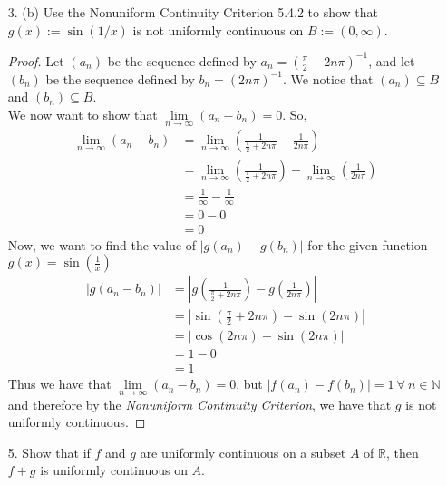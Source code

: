\documentclass[12pt,letterpaper]{article}
\newcommand{\abs}[1]{\left\lvert #1 \right\rvert}
\newcommand{\R}{\mathbb{R}}
\newcommand{\N}{\mathbb{N}}
\theoremstyle{case}
\theoremstyle{definition}
\begin{document}
\begin{enumerate}
\begin{enumerate}
				\item[3. (b)] Use the Nonuniform Continuity Criterion 5.4.2 to show that $g(x):=\sin (1/x)$ is not uniformly continuous on $B:=(0, \infty)$.\\
				
				\begin{proof}
					Let $(a_n)$ be the sequence defined by $a_n=(\frac{\pi}{2}+2n\pi)^{-1}$, and let $(b_n)$ be the sequence defined by $b_n=(2n\pi)^{-1}$. We notice that $(a_n) \subseteq B$ and $(b_n) \subseteq B$.\\
					
					We now want to show that $\lim\limits_{n \to \infty} (a_n-b_n)=0$. So,
					\begin{align*}
						\lim\limits_{n \to \infty} (a_n - b_n) &= \lim\limits_{n \to \infty} \left(\frac{1}{\frac{\pi}{2}+2n\pi}-\frac{1}{2n\pi}\right) \\
						&= \lim\limits_{n \to \infty} \left(\frac{1}{\frac{\pi}{2}+2n\pi}\right)-\lim\limits_{n \to \infty} \left(\frac{1}{2n\pi}\right) \\
						&= \frac{1}{\infty} - \frac{1}{\infty} \\
						&= 0-0 \\
						&= 0
					\end{align*}
					Now, we want to find the value of $|g(a_n)-g(b_n)|$ for the given function $g(x)=\sin \left(\frac{1}{x}\right)$
					\begin{align*}
						|g(a_n-b_n)| &= \abs{g\left(\frac{1}{\frac{\pi}{2}+2n\pi}\right)-g\left(\frac{1}{2n\pi}\right)} \\
						&= |\sin(\frac{\pi}{2}+2n\pi)-\sin(2n\pi)| \\
						&= |\cos (2n\pi) - \sin (2n\pi)| \\
						&=1-0 \\
						&= 1
					\end{align*}
					Thus we have that $\lim\limits_{n \to \infty} (a_n-b_n)=0$, but $|f(a_n)-f(b_n)|=1\ \forall\ n \in \N$ and therefore by the \textit{Nonuniform Continuity Criterion}, we have that $g$ is not uniformly continuous.
				\end{proof}
				
				\item[5.] Show that if $f$ and $g$ are uniformly continuous on a subset $A$ of $\R$, then $f+g$ is uniformly continuous on $A$.\\
				

\end{enumerate}
\end{enumerate}
\end{document}
